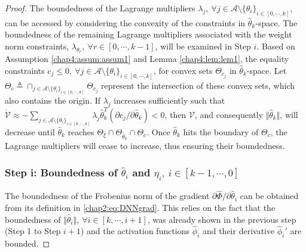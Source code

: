 \begin{proof}
The boundedness of the Lagrange multipliers $\lambda_j,\ \forall j\in\mathcal A\setminus\{\theta_i\}_{i\in[0,\cdots,k]}$, can be accessed by considering the convexity of the constraints in $\hat\theta_k$-space.
The boundedness of the remaining Lagrange multipliers associated with the weight norm constraints, $\lambda_{\theta_r},\ \forall r\in[0,\cdots,k-1]$, will be examined in Step $i$. Based on Assumption \ref{chap4:assum:assum1} and Lemma \ref{chap4:lem:lem1},  
the equality constraints $c_j \le 0, \ \forall j\in\mathcal A\setminus \{\theta_i\}_{i\in[0,\cdots,k]}$, for convex sets $\Theta_{c_j}$ in $\hat\theta_k$-space.
Let $\Theta_c\triangleq \cap_{j\in\mathcal A\setminus \{\theta_i\}_{i\in[0,\cdots ,k]}} \Theta_{c_j}$ represent the intersection of these convex sets, which also contains the origin.
If $\lambda_j$ increases sufficiently such that $\dot{\mathcal V} \approx -\sum_{j\in\mathcal A\setminus \{\theta_i\}_{i\in[0,\cdots,k]}}\lambda_j\hat\theta_k^T(\partial c_j/\partial \hat\theta_k)<0$, then ${\mathcal V}$, and consequently $\Vert\hat\theta_k\Vert$, will decrease until $\hat\theta_k$ reaches $\Theta_\xi\cap\Theta_{\hat\theta_k}\cap\Theta_c$. Once $\hat\theta_k$ hits the boundary of $\Theta_c$, the Lagrange multipliers will cease to increase, thus ensuring their boundedness.

\subsubsection{Step i: Boundedness of $\hat\theta_i$ and $\eta_i, \ i\in[k-1,\cdots,0]$}

The boundedness of the Frobenius norm of the gradient $\partial\hat\Phi/\partial \hat\theta_i$ can be obtained from its definition in \eqref{chap2:eq:DNNgrad}. This relies on the fact that the boundedness of $\Vert\hat\theta_i\Vert,\ \forall i\in[k,\cdots,i+1]$, was already shown in the previous step (\ie Step 1 to Step $i+1$) and the activation functions $\hat\phi_i$ and their derivative $\hat\phi_i'$ are bounded.


\end{proof}
